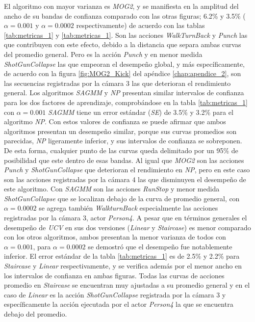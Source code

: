 El algoritmo con mayor varianza es \textit{MOG2}, y se manifiesta en la amplitud del ancho de su bandas de confianza comparado con las otras figuras; 6.2\% y 3.5\% ($\alpha=0.001$ y $\alpha=0.0002$ respectivamente) de acuerdo con las tablas \ref{tab:metricas_1} y \ref{tab:metricas_1}. Son las acciones \textit{WalkTurnBack} y \textit{Punch} las que contribuyen con este efecto, debido a la distancia que separa ambas curvas del promedio general. Pero es la acción \textit{Punch} y en menor medida \textit{ShotGunCollapse} las que empeoran el desempeño global, y más específicamente, de acuerdo con la figura \ref{fig:MOG2_Kick} del apéndice \ref{chap:apendice_2}, son las secuencias registradas por la cámara 3 las que deterioran el rendimiento general. Los algoritmos \textit{SAGMM} y \textit{NP} presentan similar intervalos de confianza para los dos factores de aprendizaje, comprobándose en la tabla \ref{tab:metricas_1} con $\alpha=0.001$ \textit{SAGMM} tiene un error estándar (\textit{SE}) de 3.5\% y 3.2\% para el algoritmo \textit{NP}. Con estos valores de confianza se puede afirmar que ambos algoritmos presentan un desempeño similar, porque sus curvas promedios son parecidas, \textit{NP} ligeramente inferior, y sus intervalos de confianza se sobreponen. De esta forma, cualquier punto de las curvas queda delimitado por un 95\% de posibilidad que este dentro de esas bandas. Al igual que \textit{MOG2} son las acciones \textit{Punch} y \textit{ShotGunCollapse} que deterioran el rendimiento en \textit{NP}, pero en este caso son las acciones registradas por la cámara 4 las que disminuyen el desempeño de este algoritmo. Con \textit{SAGMM} son las acciones \textit{RunStop} y menor medida \textit{ShotGunCollapse} que se localizan debajo de la curva de promedio general, con $\alpha=0.0002$ se agrega también \textit{WalkturnBack} especialmente las acciones registradas por la cámara 3, actor \textit{Person4}. A pesar que en términos generales el desempeño de \textit{UCV} en sus dos versiones (\textit{Linear} y \textit{Staircase}) es menor comparado con los otros algoritmos, ambos presentan la menor varianza de todos con $\alpha=0.001$, para $\alpha=0.0002$ se demostró que el desempeño fue notablemente inferior. El error estándar de la tabla \ref{tab:metricas_1} es  de 2.5\% y 2.2\% para   \textit{Staircase} y \textit{Linear} respectivamente, y se verifica además por el menor ancho en los intervalos de confianza en ambas figuras. Todas las curvas de acciones promedio en \textit{Staircase} se encuentran muy ajustadas a su promedio general y en el caso de \textit{Linear} es la acción \textit{ShotGunCollapse} registrada por la cámara 3 y específicamente la acción ejecutada por el actor \textit{Person4}  la que se encuentra debajo del promedio.

